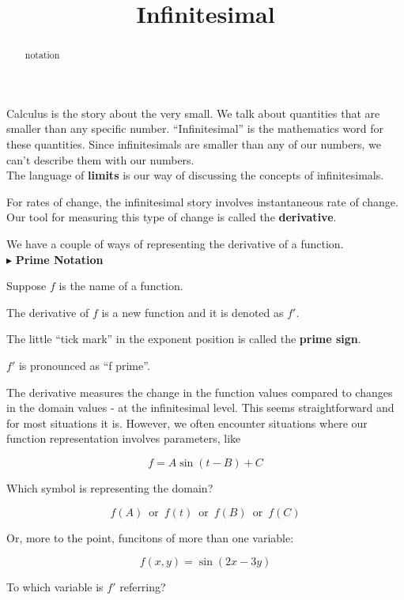 \documentclass{ximera}
\title{Infinitesimal}
\begin{document}
\begin{abstract}
notation
\end{abstract}
\maketitle




Calculus is the story about the very small.  We talk about quantities that are smaller than any specific number.  ``Infinitesimal'' is the mathematics word for these quantities. Since infinitesimals are smaller than any of our numbers, we can't describe them with our numbers.  \\

The language of \textbf{limits} is our way of discussing the concepts of infinitesimals.  


For rates of change, the infinitesimal story involves instantaneous rate of change.  Our tool for measuring this type of change is called the \textbf{derivative}.

We have a couple of ways of representing the derivative of a function. \\


$\blacktriangleright$  \textbf{\textcolor{purple!85!blue}{Prime Notation}}


Suppose $f$ is the name of a function.

The derivative of $f$ is a new function and it is denoted as \textbf{\textcolor{purple!85!blue}{$f'$}}.

The little ``tick mark'' in the exponent position is called the \textbf{\textcolor{purple!85!blue}{prime sign}}.


$f'$ is pronounced as ``f prime''.


The derivative measures the change in the function values compared to changes in the domain values - at the infinitesimal level. This seems straightforward and for most situations it is.  However, we often encounter situations where our function representation involves parameters, like


\[
f = A \sin(t - B) + C
\]

Which symbol is representing the domain?


\[
f(A)   \, \text{ or } \, f(t)   \, \text{ or } \, f(B)   \, \text{ or } \, f(C)   
\]


Or, more to the point, funcitons of more than one variable:


\[
f(x, y) = \sin(2x - 3y)
\]

To which variable is $f'$ referring? \\
\end{document}
